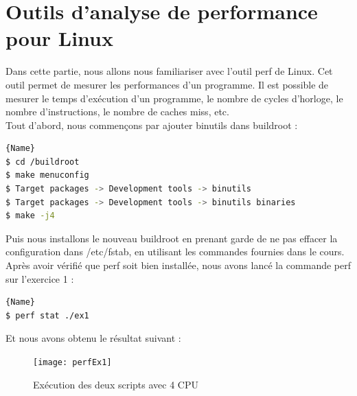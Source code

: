 \documentclass[
	a4paper, %
	10pt, %
]{CSUniSchoolLabReport}
\begin{document}
\section{Outils d'analyse de performance pour Linux}
Dans cette partie, nous allons nous familiariser avec l'outil perf de Linux. Cet outil permet de mesurer les performances d'un programme. Il est possible de mesurer le temps d'ex\'ecution d'un programme, le nombre de cycles d'horloge, le nombre d'instructions, le nombre de caches miss, etc.\\

Tout d'abord, nous commen\c{c}ons par ajouter binutils dans buildroot :
\begin{lstlisting}[language=bash, firstnumber=1]{Name}
$ cd /buildroot
$ make menuconfig
$ Target packages -> Development tools -> binutils
$ Target packages -> Development tools -> binutils binaries
$ make -j4
\end{lstlisting}

Puis nous installons le nouveau buildroot en prenant garde de ne pas effacer la configuration dans /etc/fstab, en utilisant les commandes fournies dans le cours.
Apr\`es avoir v\'erifié que perf soit bien installée, nous avons lancé la commande perf sur l'exercice 1 :
\begin{lstlisting}[language=bash, firstnumber=1]{Name}
$ perf stat ./ex1
\end{lstlisting}
Et nous avons obtenu le r\'esultat suivant :
\begin{figure}[H]
	\centering
	\texttt{[image: perfEx1]}
	\caption{Ex\'ecution des deux scripts avec 4 CPU}
	\label{fig:perfEx1}
\end{figure}
\end{document}
